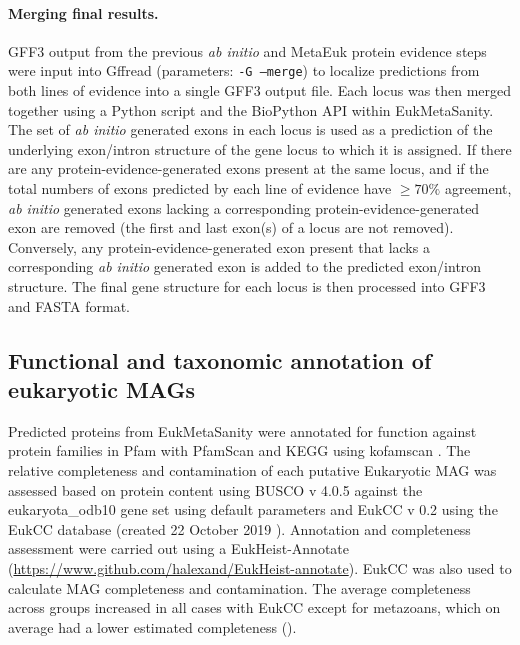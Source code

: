 \documentclass[12pt]{article}
\numberwithin{equation}{section}
\begin{document}
\paragraph{Merging final results.} GFF3 output from the previous \textit{ab initio} and MetaEuk protein evidence steps were input into Gffread \citep{Pertea2020} (parameters: \texttt{-G --merge}) to localize predictions from both lines of evidence into a single GFF3 output file.  Each locus was then merged together using a Python \citep{Python} script and the BioPython API \citep{BioPython} within EukMetaSanity. The set of \textit{ab initio} generated exons in each locus is used as a prediction of the underlying exon/intron structure of the gene locus to which it is assigned. If there are any protein-evidence-generated exons present at the same locus, and if the total numbers of exons predicted by each line of evidence have $\geq 70\%$ agreement, \textit{ab initio} generated exons lacking a corresponding protein-evidence-generated exon are removed (the first and last exon(s) of a locus are not removed). Conversely, any protein-evidence-generated exon present that lacks a corresponding \textit{ab initio} generated exon is added to the predicted exon/intron structure. The final gene structure for each locus is then processed into GFF3 and FASTA format.

\subsection*{Functional and taxonomic annotation of eukaryotic MAGs} 

Predicted proteins from EukMetaSanity were annotated for function against protein families in Pfam with PfamScan \citep{Finn2014Pfam} and KEGG using kofamscan \citep{Kanehisa_2019, Aramaki_2019}. The relative completeness and contamination  of each putative Eukaryotic MAG was assessed based on protein content using BUSCO v 4.0.5 against the eukaryota\_odb10 gene set using default parameters \citep{Simao2015BUSCO} and EukCC v 0.2 using the EukCC database (created 22 October 2019 \citep{Saary2020Estimating}). Annotation and completeness assessment were carried out using a EukHeist-Annotate (\url{https://www.github.com/halexand/EukHeist-annotate}). EukCC \citep{Saary2020Estimating} was also used to calculate MAG completeness and contamination. The average completeness across groups increased in all cases with EukCC except for metazoans, which on average had a lower estimated completeness (). 
\end{document}
